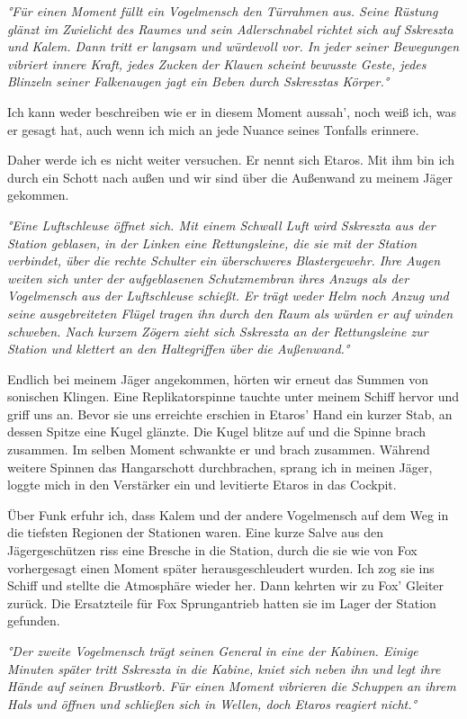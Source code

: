 \documentclass[11pt]{scrartcl}
\begin{document}
\emph{°Für einen Moment füllt ein Vogelmensch den Türrahmen aus. Seine
Rüstung glänzt im Zwielicht des Raumes und sein Adlerschnabel richtet
sich auf Sskreszta und Kalem. Dann tritt er langsam und würdevoll vor.
In jeder seiner Bewegungen vibriert innere Kraft, jedes Zucken der
Klauen scheint bewusste Geste, jedes Blinzeln seiner Falkenaugen jagt
ein Beben durch Sskresztas Körper.°}

Ich kann weder beschreiben wie er in diesem Moment aussah', noch weiß
ich, was er gesagt hat, auch wenn ich mich an jede Nuance seines
Tonfalls erinnere.

Daher werde ich es nicht weiter versuchen. Er nennt sich Etaros. Mit ihm
bin ich durch ein Schott nach außen und wir sind über die Außenwand zu
meinem Jäger gekommen.

\emph{°Eine Luftschleuse öffnet sich. Mit einem Schwall Luft wird
Sskreszta aus der Station geblasen, in der Linken eine Rettungsleine,
die sie mit der Station verbindet, über die rechte Schulter ein
überschweres Blastergewehr. Ihre Augen weiten sich unter der
aufgeblasenen Schutzmembran ihres Anzugs als der Vogelmensch aus der
Luftschleuse schießt. Er trägt weder Helm noch Anzug und seine
ausgebreiteten Flügel tragen ihn durch den Raum als würden er auf winden
schweben. Nach kurzem Zögern zieht sich Sskreszta an der Rettungsleine
zur Station und klettert an den Haltegriffen über die Außenwand.°}

Endlich bei meinem Jäger angekommen, hörten wir erneut das Summen von
sonischen Klingen. Eine Replikatorspinne tauchte unter meinem Schiff
hervor und griff uns an. Bevor sie uns erreichte erschien in Etaros'
Hand ein kurzer Stab, an dessen Spitze eine Kugel glänzte. Die Kugel
blitze auf und die Spinne brach zusammen. Im selben Moment schwankte er
und brach zusammen. Während weitere Spinnen das Hangarschott
durchbrachen, sprang ich in meinen Jäger, loggte mich in den Verstärker
ein und levitierte Etaros in das Cockpit.

Über Funk erfuhr ich, dass Kalem und der andere Vogelmensch auf dem Weg
in die tiefsten Regionen der Stationen waren. Eine kurze Salve aus den
Jägergeschützen riss eine Bresche in die Station, durch die sie wie von
Fox vorhergesagt einen Moment später herausgeschleudert wurden. Ich zog
sie ins Schiff und stellte die Atmosphäre wieder her. Dann kehrten wir
zu Fox' Gleiter zurück. Die Ersatzteile für Fox Sprungantrieb hatten sie
im Lager der Station gefunden.

\emph{°Der zweite Vogelmensch trägt seinen General in eine der Kabinen.
Einige Minuten später tritt Sskreszta in die Kabine, kniet sich neben
ihn und legt ihre Hände auf seinen Brustkorb. Für einen Moment vibrieren
die Schuppen an ihrem Hals und öffnen und schließen sich in Wellen, doch
Etaros reagiert nicht.°}
\end{document}
